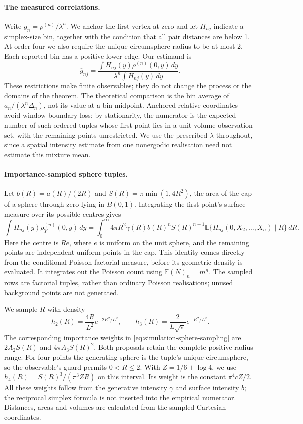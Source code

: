 \documentclass[11pt,a4paper]{article}
\numberwithin{equation}{section}
\theoremstyle{definition}
\theoremstyle{remark}
\newcommand{\E}{\mathbb E}
\begin{document}
\paragraph{The measured correlations.}
Write $g_n=\rho^{(n)}/\lambda^n$. We anchor the first vertex at zero and
let $H_{nj}$ indicate a simplex-size bin, together with the condition that
all pair distances are below 1. At order four we also require the unique
circumsphere radius to be at most 2. Each reported bin has a positive lower
edge. Our estimand is
\begin{equation}
 \overline g_{nj}=
 \frac{\int H_{nj}(y)\rho^{(n)}(0,y)\,dy}
      {\lambda^n\int H_{nj}(y)\,dy}.
 \label{eq:simulation-estimand}
\end{equation}
These restrictions make finite observables; they do not change the process
or the domains of the theorem. The theoretical comparison is the bin average
of $a_n/(\lambda^n\Delta_n)$, not its value at a bin midpoint. Anchored
relative coordinates avoid window boundary loss: by stationarity, the
numerator is the expected number of such ordered tuples whose first point
lies in a unit-volume observation set, with the remaining points unrestricted.
We use the prescribed $\lambda$ throughout, since a spatial intensity
estimate from one nonergodic realisation need not estimate this mixture mean.

\paragraph{Importance-sampled sphere tuples.}
Let $b(R)=a(R)/(2R)$ and $S(R)=\pi\min(1,4R^2)$, the area of the cap of a
sphere through zero lying in $B(0,1)$. Integrating the first point's surface
measure over its possible centres gives
\begin{equation}
 \int H_{nj}(y)\rho_Y^{(n)}(0,y)\,dy
 =\int_0^\infty 4\pi R^2\gamma(R)b(R)^n S(R)^{n-1}
       \E\{H_{nj}(0,X_2,\ldots,X_n)\mid R\}\,dR.
 \label{eq:simulation-sphere-sampling}
\end{equation}
Here the centre is $Re$, where $e$ is uniform on the unit sphere, and the
remaining points are independent uniform points in the cap. This identity
comes directly from the conditional Poisson factorial measure, before its
geometric density is evaluated. It integrates out the Poisson count using
$\E(N)_n=m^n$. The sampled rows are factorial tuples, rather than ordinary
Poisson realisations; unused background points are not generated.

We sample $R$ with density
\[
 h_2(R)=\frac{4R}{L^2}e^{-2R^2/L^2},\qquad
 h_3(R)=\frac{2}{L\sqrt\pi}e^{-R^2/L^2}.
\]
The corresponding importance weights in
\eqref{eq:simulation-sphere-sampling} are $2A_2S(R)$ and
$4\pi A_3S(R)^2$. Both proposals retain the complete positive radius range.
For four points the generating sphere is the tuple's unique circumsphere,
so the observable's guard permits $0<R\leq2$. With
$Z=1/6+\log4$, we use $h_4(R)=S(R)^3/(\pi^3ZR)$ on this interval.
Its weight is the constant $\pi^4cZ/2$. All these weights follow from the
generative intensity $\gamma$ and surface intensity $b$; the reciprocal
simplex formula is not inserted into the empirical numerator. Distances,
areas and volumes are calculated from the sampled Cartesian coordinates.
\end{document}
